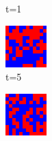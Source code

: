 \documentclass[a4paper, 11pt]{article}
\begin{document}
\begin{figure}[H]
\begin{subfigure}{.25\textwidth}
  \caption{t=1}
\end{subfigure}%
\begin{subfigure}{.25\textwidth}
  \centering
  \includegraphics[width=0.9\linewidth]{SNOWDRIFT_MOORE_12x12_t05}
  \caption{t=5}
\end{subfigure}%
\begin{subfigure}{.25\textwidth}
  \centering
  \includegraphics[width=0.9\linewidth]{SNOWDRIFT_MOORE_12x12_t10}

\end{subfigure}
\end{figure}
\end{document}

